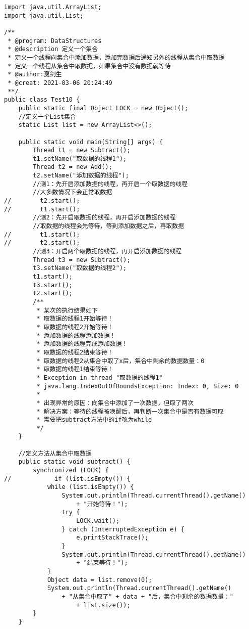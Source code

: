 \documentclass[a4paper]{report}
\begin{document}
\begin{Verbatim}[frame=single,numbersep=5pt,xleftmargin=1.5em,xrightmargin=1.5em]
import java.util.ArrayList;
import java.util.List;

/**
 * @program: DataStructures
 * @description 定义一个集合
 * 定义一个线程向集合中添加数据，添加完数据后通知另外的线程从集合中取数据
 * 定义一个线程从集合中取数据，如果集合中没有数据就等待
 * @author:戛剑生
 * @creat: 2021-03-06 20:24:49
 **/
public class Test10 {
    public static final Object LOCK = new Object();
    //定义一个List集合
    static List list = new ArrayList<>();

    public static void main(String[] args) {
        Thread t1 = new Subtract();
        t1.setName("取数据的线程1");
        Thread t2 = new Add();
        t2.setName("添加数据的线程");
        //测1：先开启添加数据的线程，再开启一个取数据的线程
        //大多数情况下会正常取数据
//        t2.start();
//        t1.start();
        //测2：先开启取数据的线程，再开启添加数据的线程
        //取数据的线程会先等待，等到添加数据之后，再取数据
//        t1.start();
//        t2.start();
        //测3：开启两个取数据的线程，再开启添加数据的线程
        Thread t3 = new Subtract();
        t3.setName("取数据的线程2");
        t1.start();
        t3.start();
        t2.start();
        /**
         * 某次的执行结果如下
         * 取数据的线程1开始等待！
         * 取数据的线程2开始等待！
         * 添加数据的线程添加数据！
         * 添加数据的线程完成添加数据！
         * 取数据的线程2结束等待！
         * 取数据的线程2从集合中取了x后，集合中剩余的数据数量：0
         * 取数据的线程1结束等待！
         * Exception in thread "取数据的线程1"
         * java.lang.IndexOutOfBoundsException: Index: 0, Size: 0
         *
         * 出现异常的原因：向集合中添加了一次数据，但取了两次
         * 解决方案：等待的线程被唤醒后，再判断一次集合中是否有数据可取
         * 需要把subtract方法中的if改为while
         */
    }

    //定义方法从集合中取数据
    public static void subtract() {
        synchronized (LOCK) {
//            if (list.isEmpty()) {
            while (list.isEmpty()) {
                System.out.println(Thread.currentThread().getName()
                    + "开始等待！");
                try {
                    LOCK.wait();
                } catch (InterruptedException e) {
                    e.printStackTrace();
                }
                System.out.println(Thread.currentThread().getName()
                    + "结束等待！");
            }
            Object data = list.remove(0);
            System.out.println(Thread.currentThread().getName()
                + "从集合中取了" + data + "后，集合中剩余的数据数量："
                    + list.size());
        }
    }


\end{Verbatim}
\end{document}
